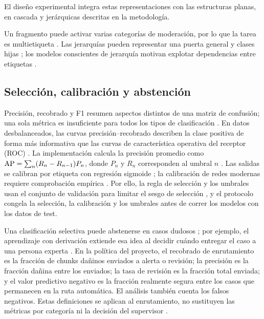 El diseño experimental integra estas representaciones con las estructuras planas, en cascada y jerárquicas descritas en la metodología.

Un fragmento puede activar varias categorías de moderación, por lo que la tarea es multietiqueta \cite{tsoumakas2007multilabel,zhang2014multilabel}. Las jerarquías pueden representar una puerta general y clases hijas \cite{silla2011hierarchical}; los modelos conscientes de jerarquía motivan explotar dependencias entre etiquetas \cite{zhou2020hiagm}.

\subsection{Selección, calibración y abstención}

Precisión, recobrado y F1 resumen aspectos distintos de una matriz de confusión; una sola métrica es insuficiente para todos los tipos de clasificación \cite{sokolova2009metrics}. En datos desbalanceados, las curvas precisión--recobrado describen la clase positiva de forma más informativa que las curvas de característica operativa del receptor (ROC) \cite{saito2015pr,davis2006pr}. La implementación calcula la precisión promedio como \(\operatorname{AP}=\sum_n(R_n-R_{n-1})P_n\), donde \(P_n\) y \(R_n\) corresponden al umbral \(n\) \cite{sklearn2026averageprecision}. Las salidas se calibran por etiqueta con regresión sigmoide \cite{platt1999probabilistic,niculescu2005probabilities}; la calibración de redes modernas requiere comprobación empírica \cite{guo2017calibration}. Por ello, la regla de selección y los umbrales usan el conjunto de validación para limitar el sesgo de selección \cite{cawley2010selection}, y el protocolo congela la selección, la calibración y los umbrales antes de correr los modelos con los datos de test.

Una clasificación selectiva puede abstenerse en casos dudosos \cite{chow1970reject,geifman2017selective}; por ejemplo, el aprendizaje con derivación extiende esa idea al decidir cuándo entregar el caso a una persona experta \cite{mozannar2020defer}. En la política del proyecto, el recobrado de enrutamiento es la fracción de chunks dañinos enviados a alerta o revisión; la precisión es la fracción dañina entre los enviados; la tasa de revisión es la fracción total enviada; y el valor predictivo negativo es la fracción realmente segura entre los casos que permanecen en la ruta automática. El análisis también cuenta los falsos negativos. Estas definiciones se aplican al enrutamiento, no sustituyen las métricas por categoría ni la decisión del supervisor \cite{sokolova2009metrics}.

